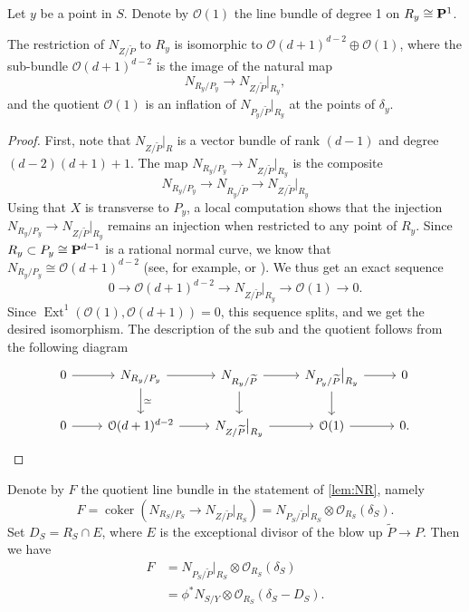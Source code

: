 \documentclass[11 pt]{amsart}
\renewcommand{\O}{{\mathcal O}}
\renewcommand {\P}{{\bf P}}
\providecommand{\coker}{\operatorname{coker}}
\providecommand{\Ext}{\operatorname{Ext}}
\numberwithin{equation}{section}
\begin{document}
Let $y$ be a point in $S$.
Denote by $\O(1)$ the line bundle of degree 1 on $R_y \cong \P^1$.
\begin{proposition}
  \label{lem:NR}
  The restriction of $N_{Z/\widetilde{P}}$ to $R_y$ is isomorphic to $\O(d+1)^{d-2} \oplus \O(1)$, where the sub-bundle $\O(d+1)^{d-2}$ is the image of the natural map
  \[ N_{R_y/P_y} \to N_{Z/\widetilde{P}}\big|_{R_y},\]
  and the quotient $\O(1)$ is an inflation of $N_{P_y/\widetilde{P}}\big |_{R_y}$ at the points of $\delta_y$.
\end{proposition}
\begin{proof}
  First, note that $N_{Z/\widetilde{P}}\big|_R$ is a vector bundle of rank $(d-1)$ and degree $(d-2)(d+1)+1$.
  The map $N_{R_y/P_y} \to N_{Z/\widetilde{P}}\big|_{R_y}$ is the composite
  \[ N_{R_y/P_y} \to N_{R_y/\widetilde{P}} \to N_{Z/\widetilde{P}}\big|_{R_y}\]
  Using that $X$ is transverse to $P_y$, a local computation shows that the injection $N_{R_y/P_y} \to N_{Z/\widetilde{P}}\big|_{R_y}$ remains an injection when restricted to any point of $R_y$.
  Since $R_y \subset P_y \cong \P^{d-1}$ is a rational normal curve, we know that $N_{R_y/P_y} \cong \O(d+1)^{d-2}$ (see, for example, \cite[II]{sac:80} or \cite[Example~4.6.6]{ser:06}).
  We thus get an exact sequence
  \begin{equation}
    0 \to \O(d+1)^{d-2} \to N_{Z/\widetilde{P}}\big|_{R_y} \to \O(1) \to 0.
  \end{equation}
  Since $\Ext^1(\O(1), \O(d+1)) = 0$, this sequence splits, and we get the desired isomorphism.
  The description of the sub and the quotient follows from the following diagram
  \[
    \begin{tikzcd}
      0 \arrow{r}& N_{R_y/P_y} \arrow{r}\arrow{d}{\simeq} &N_{R_y/\widetilde{P}} \arrow{r}\arrow{d}& N_{P_y/\widetilde{P}}\big|_{R_y} \arrow{r}\arrow{d}& 0\\
      0 \arrow{r}& \O(d+1)^{d-2} \arrow{r}& N_{Z/\widetilde{P}}\big|_{R_y} \arrow{r}& \O(1) \arrow{r}& 0.
  \end{tikzcd}
  \]
\end{proof}
Denote by $F$ the quotient line bundle in the statement of \autoref{lem:NR}, namely
\[F = \coker \left(N_{R_S/P_S} \to N_{Z/\widetilde{P}} \big|_{R_S} \right) = N_{P_S/\widetilde{P}}\big|_{R_S} \otimes \O_{R_S}\left(\delta_S\right) .\]
Set $D_S = R_S \cap E$, where $E$ is the exceptional divisor of the blow up $\widetilde{P} \to P$.
Then we have
\begin{align*}
  F &= N_{P_S/\widetilde{P}}\big|_{R_S} \otimes \O_{R_S}\left(\delta_S\right) \\
  &= \phi^* N_{S/Y} \otimes \O_{R_S}\left(\delta_S - D_S\right).
\end{align*}
\end{document}
